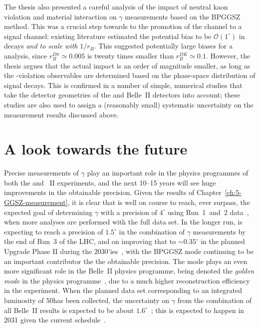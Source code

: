 The thesis also presented a careful analysis of the impact of neutral kaon \CP violation and material interaction on $\gamma$ measurements based on the BPGGSZ method. This was a crucial step towards to the promotion of the \BtoDpi channel to a signal channel: existing literature estimated the potential bias to be $\mathcal O(1^\circ)$ in \BtoDK decays \emph{and to scale with} $1/r_B$. This suggested potentially large biases for a \BtoDpi analysis, since $r_B^{D\pi}\simeq0.005$ is twenty times smaller than $r_B^{DK}\simeq 0.1$. However, the thesis argues that the actual impact is an order of magnitude smaller, as long as the \CP-violation observables are determined based on the phase-space distribution of signal decays. This is confirmed in a number of simple, numerical studies that take the detector geometries of the \lhcb and Belle~II detectors into account; these studies are also used to assign a (reasonably small) systematic uncertainty on the measurement results discussed above.

\section{A look towards the future} %
\label{sec:a_look_towards_the_future}


Precise measurements of $\gamma$ play an important role in the physics programmes of both the \lhcb and \belle~II experiments, and the next 10--15 years will see huge improvements in the obtainable precision. Given the results of Chapter~\ref{ch:5-GGSZ-measurement}, it is clear that \lhcb is well on course to reach, ever surpass, the expected goal of determining $\gamma$ with a precision of $4^\circ$ using Run~1~and~2 data~\cite{LHCbUpgradeITDR}, when more analyses are performed with the full data set. In the longer run, \lhcb is expecting to reach a precision of $1.5^\circ$ in the combination of $\gamma$ measurements by the end of Run~3 of the LHC, and on improving that to $\sim 0.35^\circ$ in the planned Upgrade Phase II during the 2030'ies~\cite{lhcbcollaborationPhysicsCaseLHCb2019}, with the BPGGSZ mode continuing to be an important contributor the the obtainable precision. The mode plays an even more significant role in the Belle~II physics programme, being denoted the \emph{golden mode} in the physics programme~\cite{kouBelleIIPhysics2019}, due to a much higher \KS reconstruction efficiency in the experiment. When the planned data set corresponding to an integrated luminosity of 50\invab has been collected, the uncertainty on $\gamma$ from the combination of all Belle~II results is expected to be about $1.6^\circ$~\cite{kouBelleIIPhysics2019}; this is expected to happen in 2031 given the current schedule~\cite{BelleTimescale}.

